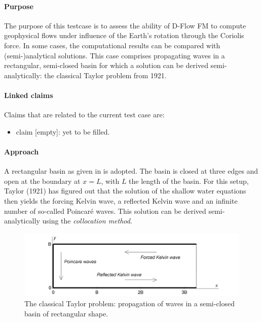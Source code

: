 \label{case:corioliswithoutfriction}

\paragraph*{Purpose}
The purpose of this testcase is to assess the ability of D-Flow FM to compute geophysical flows under influence of the Earth's rotation through the Coriolis force. In some cases, the computational results can be compared with (semi-)analytical solutions. This case comprises propagating waves in a rectangular, semi-closed basin for which a solution can be derived semi-analytically: the classical Taylor problem from 1921.

\paragraph*{Linked claims}
Claims that are related to the current test case are:
\begin{itemize}
\item claim [empty]: yet to be filled.
\end{itemize}

\paragraph*{Approach}
A rectangular basin as given in  is adopted. The basin is closed at three edges and open at the boundary at $x = L$, with $L$ the length of the basin. For this setup, Taylor (1921) has figured out that the solution of the shallow water equations then yields the forcing Kelvin wave, a reflected Kelvin wave and an infinite number of so-called Poincar\'e waves. This solution can be derived semi-analytically using the \emph{collocation method}.

\begin{figure}[h!]
\begin{center}
\includegraphics[width=1.0\columnwidth]{figures/wavesinbasin.png}
\end{center}\caption{The classical Taylor problem: propagation of waves in a semi-closed basin of rectangular shape. \label{fig:wavesinbasinfricno}}
\end{figure}

